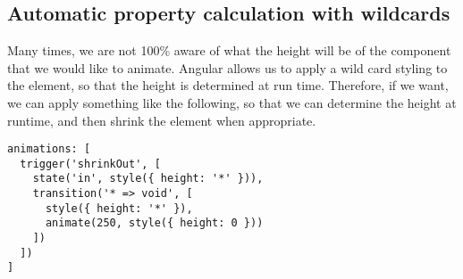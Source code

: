 \subsection{Automatic property calculation with wildcards}

Many times, we are not 100\% aware of what the height will be of the component
that we would like to animate. Angular allows us to apply a wild card styling 
to the element, so that the height is determined at run time. Therefore, if 
we want, we can apply something like the following, so that we can determine 
the height at runtime, and then shrink the element when appropriate. 

\begin{lstlisting}
animations: [
  trigger('shrinkOut', [
    state('in', style({ height: '*' })),
    transition('* => void', [
      style({ height: '*' }),
      animate(250, style({ height: 0 }))
    ])
  ])
]
\end{lstlisting}



